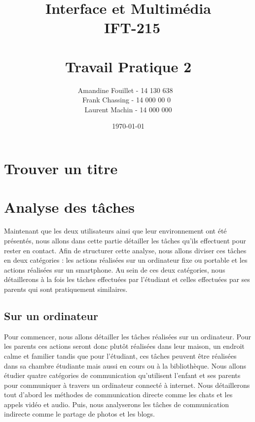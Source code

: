 \documentclass[12pt]{article}
\title{\vspace{\fill} Interface et Multimédia \\ ~\textbf{IFT-215} \\~\\ Travail Pratique 2}
\author{Amandine Fouillet - 14 130 638 ~\\ Frank Chassing - 14 000 00 0~\\ Laurent Machin - 14 000 000}
\date{\today \vspace{\fill}}
\begin{document}
\maketitle
\newpage

\section{Trouver un titre}

\section{Analyse des tâches}
Maintenant que les deux utilisateurs ainsi que leur environnement ont été présentés, nous allons dans cette partie détailler les tâches qu'ils effectuent pour rester en contact. Afin de structurer cette analyse, nous allons diviser ces tâches en deux catégories : les actions réalisées sur un ordinateur fixe ou portable et les actions réalisées sur un smartphone. Au sein de ces deux catégories, nous détaillerons à la fois les tâches effectuées par l'étudiant et celles effectuées par ses parents qui sont pratiquement similaires.

\subsection{Sur un ordinateur}
Pour commencer, nous allons détailler les tâches réalisées sur un ordinateur. Pour les parents ces actions seront donc plutôt réalisées dans leur maison, un endroit calme et familier tandis que pour l'étudiant, ces tâches peuvent être réalisées dans sa chambre étudiante mais aussi en cours ou à la bibliothèque. Nous allons étudier quatre catégories de communication qu'utilisent l'enfant et ses parents pour communiquer à travers un ordinateur connecté à internet. Nous détaillerons tout d'abord les méthodes de communication directe comme les chats et les appels vidéo et audio. Puis, nous analyserons les tâches de communication indirecte comme le partage de photos et les blogs.~\\
\end{document}

